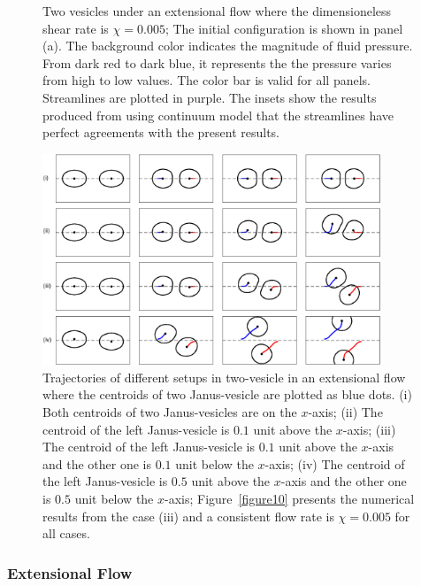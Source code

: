 \documentclass[lineno]{jfm}
\begin{document}
\begin{figure}
  \caption{Two vesicles under an extensional flow where the dimensioneless shear rate is $\chi=0.005$; The initial configuration is shown in panel (a). The background color indicates the magnitude of fluid pressure. From dark red to dark blue, it represents the the pressure varies from high to low values. The color bar is valid for all panels. Streamlines are plotted in purple. The insets show the results produced from using continuum model that the streamlines have perfect agreements with the present results.
  }
    \label{figure11}
\end{figure}


\begin{figure}
\begin{center}
\includegraphics[width=0.9\textwidth]{ExtTraj.eps}
\end{center} 
  \caption{Trajectories of different setups in two-vesicle in an extensional flow where the centroids of two Janus-vesicle are plotted as blue dots. (i) Both centroids of two Janus-vesicles are on the $x$-axis; (ii) The centroid of the left Janus-vesicle is $0.1$ unit above the $x$-axis; (iii) 
  The centroid of the left Janus-vesicle is $0.1$ unit above the $x$-axis and the other one is $0.1$ unit below the $x$-axis; (iv) The centroid of the left Janus-vesicle is $0.5$ unit above the $x$-axis and the other one is $0.5$ unit below the $x$-axis; Figure~\ref{figure10} presents the numerical results from the case (iii) and a 
  consistent flow rate is $\chi = 0.005$ for all cases.}
    \label{figure12}
\end{figure}



\subsubsection{Extensional Flow}
\end{document}
